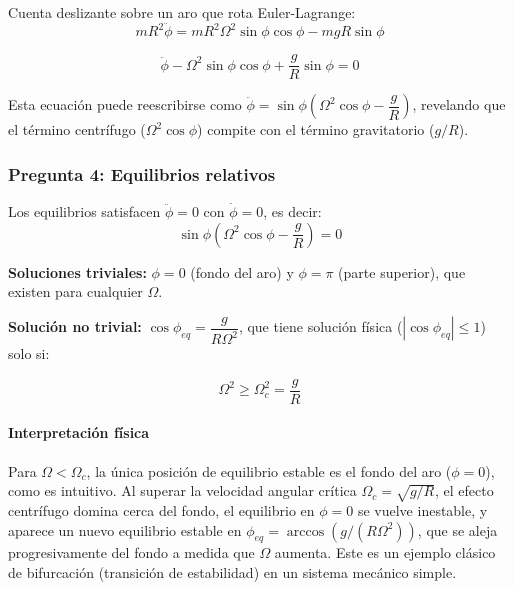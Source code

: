 \begin{solucion}{Cuenta deslizante sobre un aro que rota}
Euler-Lagrange:
$$mR^2\ddot\phi = mR^2\Omega^2\sin\phi\cos\phi - mgR\sin\phi$$

$$\boxed{\ddot\phi - \Omega^2\sin\phi\cos\phi + \frac{g}{R}\sin\phi = 0}$$

Esta ecuación puede reescribirse como $\ddot\phi = \sin\phi\left(\Omega^2\cos\phi - \dfrac{g}{R}\right)$, revelando que el término centrífugo ($\Omega^2\cos\phi$) compite con el término gravitatorio ($g/R$).

\subsubsection*{Pregunta 4: Equilibrios relativos}

Los equilibrios satisfacen $\ddot\phi = 0$ con $\dot\phi = 0$, es decir:
$$\sin\phi\left(\Omega^2\cos\phi - \frac{g}{R}\right) = 0$$

\textbf{Soluciones triviales:} $\phi = 0$ (fondo del aro) y $\phi = \pi$ (parte superior), que existen para cualquier $\Omega$.

\textbf{Solución no trivial:} $\cos\phi_{eq} = \dfrac{g}{R\Omega^2}$, que tiene solución física ($|\cos\phi_{eq}| \leq 1$) solo si:

$$\boxed{\Omega^2 \geq \Omega_c^2 = \frac{g}{R}}$$

\paragraph{Interpretación física} Para $\Omega < \Omega_c$, la única posición de equilibrio estable es el fondo del aro ($\phi=0$), como es intuitivo. Al superar la velocidad angular crítica $\Omega_c = \sqrt{g/R}$, el efecto centrífugo domina cerca del fondo, el equilibrio en $\phi=0$ se vuelve inestable, y aparece un nuevo equilibrio estable en $\phi_{eq} = \arccos(g/(R\Omega^2))$, que se aleja progresivamente del fondo a medida que $\Omega$ aumenta. Este es un ejemplo clásico de bifurcación (transición de estabilidad) en un sistema mecánico simple.
\end{solucion}
